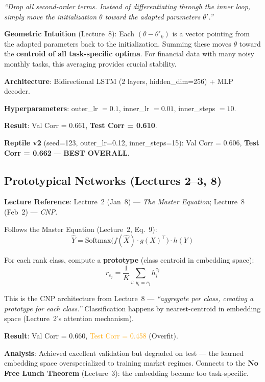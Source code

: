 \documentclass[11pt,a4paper]{article}
\begin{document}
\emph{``Drop all second-order terms. Instead of differentiating through the inner loop, simply move the initialization $\theta$ toward the adapted parameters $\theta'$.''}

\textbf{Geometric Intuition} (Lecture~8): Each $(\theta - \theta'_k)$ is a vector pointing from the adapted parameters back to the initialization. Summing these moves $\theta$ toward the \textbf{centroid of all task-specific optima}. For financial data with many noisy monthly tasks, this averaging provides crucial stability.

\textbf{Architecture}: Bidirectional LSTM (2 layers, hidden\_dim=256) + MLP decoder.

\textbf{Hyperparameters}: outer\_lr $= 0.1$, inner\_lr $= 0.01$, inner\_steps $= 10$.

\textbf{Result}: Val Corr = 0.661, \textcolor{green!60!black}{\textbf{Test Corr = 0.610}}.

\textbf{Reptile v2} (seed=123, outer\_lr=0.12, inner\_steps=15): Val Corr = 0.606, \textcolor{green!60!black}{\textbf{Test Corr = 0.662}} --- \textbf{BEST OVERALL}.

\subsection{Prototypical Networks \textnormal{(Lectures 2--3, 8)}}

\textbf{Lecture Reference}: Lecture~2 (Jan~8) --- \emph{The Master Equation}; Lecture~8 (Feb~2) --- \emph{CNP}.

Follows the Master Equation (Lecture~2, Eq.~9):
\begin{equation}
    \hat{Y} = \text{Softmax}\bigl(f(\hat{X}) \cdot g(X)^\top\bigr) \cdot h(Y)
\end{equation}

For each rank class, compute a \textbf{prototype} (class centroid in embedding space):
\begin{equation}
    r_{c_j} = \frac{1}{K} \sum_{i:\, y_i = c_j} h_i^{c_j}
\end{equation}

This is the CNP architecture from Lecture~8 --- \emph{``aggregate per class, creating a prototype for each class.''} Classification happens by nearest-centroid in embedding space (Lecture~2's attention mechanism).

\textbf{Result}: Val Corr = 0.660, \textcolor{orange}{Test Corr = 0.458} (Overfit).

\textbf{Analysis}: Achieved excellent validation but degraded on test --- the learned embedding space overspecialized to training market regimes. Connects to the \textbf{No Free Lunch Theorem} (Lecture~3): the embedding became too task-specific.
\end{document}
